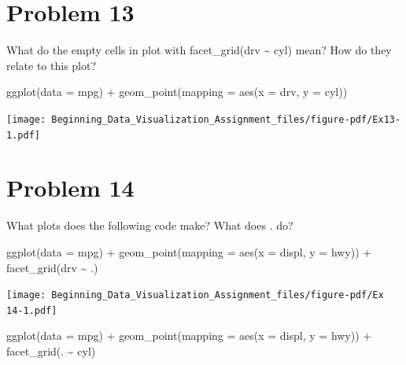 \documentclass[
  letterpaper,
  DIV=11,
  numbers=noendperiod]{scrreprt}
\newenvironment{Shaded}{\begin{snugshade}}{\end{snugshade}}
\newcommand{\AttributeTok}[1]{\textcolor[rgb]{0.40,0.45,0.13}{#1}}
\newcommand{\FunctionTok}[1]{\textcolor[rgb]{0.28,0.35,0.67}{#1}}
\newcommand{\NormalTok}[1]{\textcolor[rgb]{0.00,0.23,0.31}{#1}}
\newcommand{\SpecialCharTok}[1]{\textcolor[rgb]{0.37,0.37,0.37}{#1}}
\begin{document}
\section*{Problem 13}\label{problem-13-1}


What do the empty cells in plot with facet\_grid(drv \textasciitilde{}
cyl) mean? How do they relate to this plot?

\begin{Shaded}
\begin{Highlighting}[]
\FunctionTok{ggplot}\NormalTok{(}\AttributeTok{data =}\NormalTok{ mpg) }\SpecialCharTok{+} 
  \FunctionTok{geom\_point}\NormalTok{(}\AttributeTok{mapping =} \FunctionTok{aes}\NormalTok{(}\AttributeTok{x =}\NormalTok{ drv, }\AttributeTok{y =}\NormalTok{ cyl))}
\end{Highlighting}
\end{Shaded}

\texttt{[image: Beginning\_Data\_Visualization\_Assignment\_files/figure-pdf/Ex13-1.pdf]}

\section*{Problem 14}\label{problem-14-1}


What plots does the following code make? What does . do?

\begin{Shaded}
\begin{Highlighting}[]
\FunctionTok{ggplot}\NormalTok{(}\AttributeTok{data =}\NormalTok{ mpg) }\SpecialCharTok{+} 
  \FunctionTok{geom\_point}\NormalTok{(}\AttributeTok{mapping =} \FunctionTok{aes}\NormalTok{(}\AttributeTok{x =}\NormalTok{ displ, }\AttributeTok{y =}\NormalTok{ hwy)) }\SpecialCharTok{+}
  \FunctionTok{facet\_grid}\NormalTok{(drv }\SpecialCharTok{\textasciitilde{}}\NormalTok{ .)}
\end{Highlighting}
\end{Shaded}

\texttt{[image: Beginning\_Data\_Visualization\_Assignment\_files/figure-pdf/Ex 14-1.pdf]}

\begin{Shaded}
\begin{Highlighting}[]
\FunctionTok{ggplot}\NormalTok{(}\AttributeTok{data =}\NormalTok{ mpg) }\SpecialCharTok{+} 
  \FunctionTok{geom\_point}\NormalTok{(}\AttributeTok{mapping =} \FunctionTok{aes}\NormalTok{(}\AttributeTok{x =}\NormalTok{ displ, }\AttributeTok{y =}\NormalTok{ hwy)) }\SpecialCharTok{+}
 \FunctionTok{facet\_grid}\NormalTok{(. }\SpecialCharTok{\textasciitilde{}}\NormalTok{ cyl)}
\end{Highlighting}
\end{Shaded}
\end{document}
